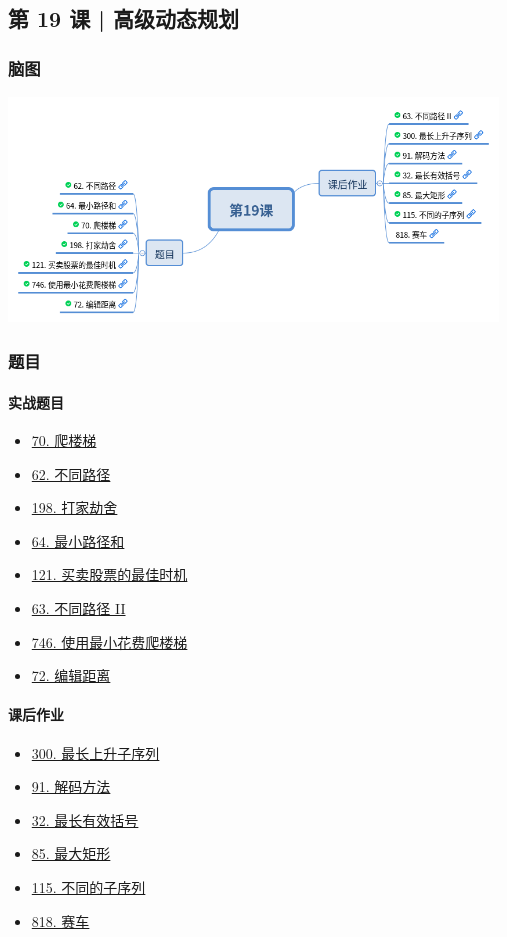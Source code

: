 \subsection{第 19 课 | 高级动态规划}

\subsubsection{脑图}

\includegraphics[width=130mm,height=60mm]{images/camp/第19课.png}

\subsubsection{题目}

\paragraph{实战题目}

\begin{itemize}
  \item \hyperref[leetcode:70]{70. 爬楼梯}
  \item \hyperref[leetcode:62]{62. 不同路径}
  \item \hyperref[leetcode:198]{198. 打家劫舍}
  \item \hyperref[leetcode:64]{64. 最小路径和}
  \item \hyperref[leetcode:121]{121. 买卖股票的最佳时机}
  \item \hyperref[leetcode:63]{63. 不同路径 II}
  \item \hyperref[leetcode:746]{746. 使用最小花费爬楼梯}
  \item \hyperref[leetcode:72]{72. 编辑距离}
\end{itemize}

\paragraph{课后作业}

\begin{itemize}
  \item \hyperref[leetcode:300]{300. 最长上升子序列}
  \item \hyperref[leetcode:91]{91. 解码方法}
  \item \hyperref[leetcode:32]{32. 最长有效括号}
  \item \hyperref[leetcode:85]{85. 最大矩形}
  \item \hyperref[leetcode:115]{115. 不同的子序列}
  \item \hyperref[leetcode:818]{818. 赛车}
\end{itemize}
